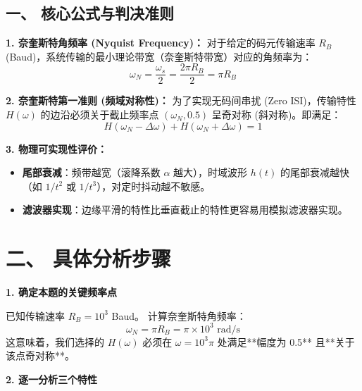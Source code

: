 \documentclass[a4paper,11pt]{ctexart}
\begin{document}
\begin{tcolorbox}[colback=white, colframe=blue!50!black, title=\textbf{题目解答：6-12 最佳基带传输特性的选择}]

    \section*{一、 核心公式与判决准则}
    
    \textbf{1. 奈奎斯特角频率 (Nyquist Frequency)：}
    对于给定的码元传输速率 $R_B$ (Baud)，系统传输的最小理论带宽（奈奎斯特带宽）对应的角频率为：
    \begin{equation}
        \omega_N = \frac{\omega_s}{2} = \frac{2\pi R_B}{2} = \pi R_B
    \end{equation}
    
    \textbf{2. 奈奎斯特第一准则 (频域对称性)：}
    为了实现无码间串扰 (Zero ISI)，传输特性 $H(\omega)$ 的边沿必须关于截止频率点 $(\omega_N, 0.5)$ 呈奇对称 (斜对称)。即满足：
    \begin{equation}
        H(\omega_N - \Delta \omega) + H(\omega_N + \Delta \omega) = 1
    \end{equation}
    
    \textbf{3. 物理可实现性评价：}
    \begin{itemize}
        \item \textbf{尾部衰减}：频带越宽（滚降系数 $\alpha$ 越大），时域波形 $h(t)$ 的尾部衰减越快（如 $1/t^2$ 或 $1/t^3$），对定时抖动越不敏感。
        \item \textbf{滤波器实现}：边缘平滑的特性比垂直截止的特性更容易用模拟滤波器实现。
    \end{itemize}

    \end{tcolorbox}

    \section*{二、 具体分析步骤}
    
    \textbf{1. 确定本题的关键频率点}
    
    已知传输速率 $R_B = 10^3$ Baud。
    计算奈奎斯特角频率：
    \begin{equation}
        \omega_N = \pi R_B = \pi \times 10^3 \text{ rad/s}
    \end{equation}
    这意味着，我们选择的 $H(\omega)$ 必须在 $\omega = 10^3\pi$ 处满足**幅度为 0.5** 且**关于该点奇对称**。
    
    \textbf{2. 逐一分析三个特性}
    
\end{document}
